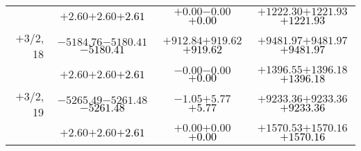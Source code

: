 \documentclass[compress]{beamer}
\begin{document}
\begin{frame}
{\begin{tabular}{r | c | c | c}
           & $+2.60$\hspace{0.1 cm}$+2.60$\hspace{0.1 cm}\textcolor{black}{$+2.61$} & $+0.00$\hspace{0.1 cm}$-0.00$\hspace{0.1 cm}\textcolor{black}{$+0.00$} & $+1222.30$\hspace{0.1 cm}$+1221.93$\hspace{0.1 cm}\textcolor{black}{$+1221.93$} \\
$+$3/2, 18 & $-5184.76$\hspace{0.1 cm}$-5180.41$\hspace{0.1 cm}\textcolor{black}{$-5180.41$} & $+912.84$\hspace{0.1 cm}$+919.62$\hspace{0.1 cm}\textcolor{black}{$+919.62$} & $+9481.97$\hspace{0.1 cm}$+9481.97$\hspace{0.1 cm}\textcolor{black}{$+9481.97$} \\
           & $+2.60$\hspace{0.1 cm}$+2.60$\hspace{0.1 cm}\textcolor{black}{$+2.61$} & $-0.00$\hspace{0.1 cm}$-0.00$\hspace{0.1 cm}\textcolor{black}{$+0.00$} & $+1396.55$\hspace{0.1 cm}$+1396.18$\hspace{0.1 cm}\textcolor{black}{$+1396.18$} \\
$+$3/2, 19 & $-5265.49$\hspace{0.1 cm}$-5261.48$\hspace{0.1 cm}\textcolor{black}{$-5261.48$} & $-1.05$\hspace{0.1 cm}$+5.77$\hspace{0.1 cm}\textcolor{black}{$+5.77$} & $+9233.36$\hspace{0.1 cm}$+9233.36$\hspace{0.1 cm}\textcolor{black}{$+9233.36$} \\
           & $+2.60$\hspace{0.1 cm}$+2.60$\hspace{0.1 cm}\textcolor{black}{$+2.61$} & $+0.00$\hspace{0.1 cm}$+0.00$\hspace{0.1 cm}\textcolor{black}{$+0.00$} & $+1570.53$\hspace{0.1 cm}$+1570.16$\hspace{0.1 cm}\textcolor{black}{$+1570.16$} \\

\end{tabular}}
\end{frame}
\end{document}
